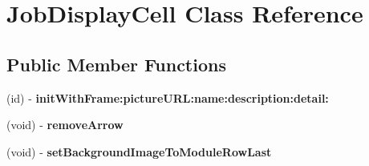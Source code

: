 \hypertarget{interface_job_display_cell}{
\section{\-Job\-Display\-Cell \-Class \-Reference}
\label{interface_job_display_cell}
}
\subsection*{\-Public \-Member \-Functions}
\begin{DoxyCompactItemize}
\item 
\hypertarget{interface_job_display_cell_affb6daf184d9de4cec81378df0c19eaa}{
(id) -\/ {\bfseries init\-With\-Frame\-:picture\-U\-R\-L\-:name\-:description\-:detail\-:}}
\label{interface_job_display_cell_affb6daf184d9de4cec81378df0c19eaa}

\item 
\hypertarget{interface_job_display_cell_a67e8bf8de8e72cd78fa13f77738e3609}{
(void) -\/ {\bfseries remove\-Arrow}}
\label{interface_job_display_cell_a67e8bf8de8e72cd78fa13f77738e3609}

\item 
\hypertarget{interface_job_display_cell_a139300d141c7351035546731f223f690}{
(void) -\/ {\bfseries set\-Background\-Image\-To\-Module\-Row\-Last}}
\label{interface_job_display_cell_a139300d141c7351035546731f223f690}

\end{DoxyCompactItemize}
